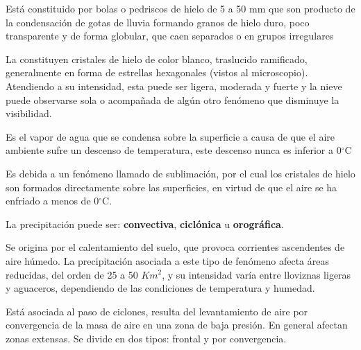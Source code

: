 \begin{definition}[Granizo]
	Está constituido por bolas o pedriscos de hielo de 5 a 50 mm que son producto de la
	condensación de gotas de lluvia formando granos de hielo duro, poco transparente y de
	forma globular, que caen separados o en grupos irregulares
\end{definition}

\begin{definition}[Nieve]
	La constituyen
	cristales de hielo de color blanco, traslucido ramificado, generalmente en forma de
	estrellas hexagonales (vistos al microscopio). Atendiendo a su intensidad, esta puede
	ser ligera, moderada y fuerte y la nieve puede observarse sola o acompañada de algún
	otro fenómeno que disminuye la visibilidad.
\end{definition}

\begin{definition}[Rocío]
	Es el vapor de agua que se
	condensa sobre la superficie a causa de que el aire ambiente sufre un descenso de
	temperatura, este descenso nunca es inferior a 0$^{\circ}$C
\end{definition}

\begin{definition}[Escarcha]
	Es debida a un
	fenómeno llamado de sublimación, por el cual los cristales de hielo son formados
	directamente sobre las superficies, en virtud de que el aire se ha enfriado a menos de
	0$^{\circ}$C.
\end{definition}

La precipitación puede ser: \textbf{convectiva}, \textbf{ciclónica} u \textbf{orográfica}.

\begin{definition}
	Se origina por el calentamiento del suelo, que
	provoca corrientes ascendentes de aire húmedo. La precipitación asociada a este tipo
	de fenómeno afecta áreas reducidas, del orden de 25 a 50 $Km^2 $, y su intensidad varía
	entre lloviznas ligeras y aguaceros, dependiendo de las condiciones de temperatura y
	humedad.
\end{definition}

\begin{definition}
	Está asociada al paso de ciclones, resulta del
	levantamiento de aire por convergencia de la masa de aire en una zona de baja
	presión. En general afectan zonas extensas. Se divide en dos tipos: frontal y por
	convergencia.
\end{definition}

